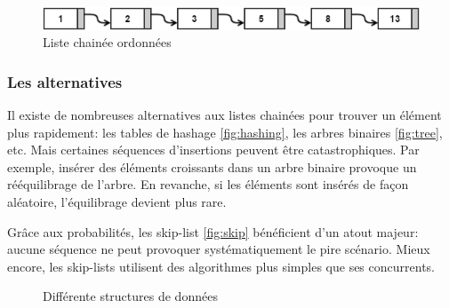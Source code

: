\documentclass[hidelinks,a4paper, 12pt]{article}
\begin{document}
	\begin{figure}[h]
		\label{LinkedList}
		\includegraphics[width=\textwidth]{img/linkedList}
		\caption{Liste chainée ordonnées}
	\end{figure}
	
	\subsubsection*{Les alternatives}
	Il existe de nombreuses alternatives aux listes chainées pour trouver un élément plus rapidement: les tables de hashage \ref{fig:hashing}, les arbres binaires \ref{fig:tree}, etc. Mais certaines séquences d'insertions peuvent être catastrophiques. Par exemple, insérer des éléments croissants dans un arbre binaire provoque un rééquilibrage de l'arbre. En revanche, si les éléments sont insérés de façon aléatoire, l'équilibrage devient plus rare.

	Grâce aux probabilités, les \og skip-list \fg{} \ref{fig:skip} bénéficient d'un atout majeur: aucune séquence ne peut provoquer systématiquement le pire scénario. Mieux encore, les skip-lists utilisent des algorithmes plus simples que ses concurrents.
	
	\begin{figure}[h]
		\centering
		\caption{Différente structures de données}
	\end{figure}
	
\end{document}
